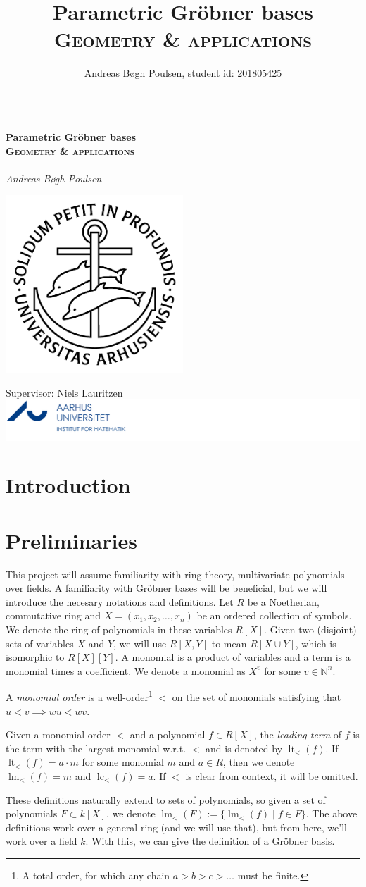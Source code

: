 \documentclass[a4paper, 12pt]{article}
\title{Parametric Gröbner bases\\{\large \textsc{Geometry \& applications}}}
\author{Andreas Bøgh Poulsen, student id: 201805425}
\newcommand{\N}{\mathbb{N}}
\DeclareMathOperator{\LT}{lt}
\DeclareMathOperator{\LM}{lm}
\DeclareMathOperator{\LC}{lc}
\theoremstyle{changedot}
\theoremstyle{changedotbreak}
\theoremstyle{nonumberplain}
\newcommand*{\titleGM}{%
\hspace*{0.2\textwidth} %
\rule{1pt}{\textheight} %
\hspace*{0.05\textwidth} %
\parbox[b]{0.75\textwidth}{ %
{\noindent\Huge\bfseries  Parametric Gröbner bases\\{\large \textsc{Geometry \& applications}}\\}\\[2\baselineskip] %
{\large \textit{Andreas Bøgh Poulsen \hfill \oldstylenums{201805425} }}\\%
{\large } %
\parbox[b][0pt]{0.5\textwidth}{
  \hspace{2cm}\includegraphics[width=0.5\textwidth]{ausegl_sort.png}
  \vspace{-10cm}
}

\vspace{0.5\textheight} %
\vfill
{\noindent Supervisor: Niels Lauritzen \hspace{2.5cm} \includegraphics{AU_logo.png}  }\\[\baselineskip] %
}%
}
\begin{document}
{}
\titleGM
\newpage
\tableofcontents

\newpage
{}

\section*{Introduction}


\section{Preliminaries}
This project will assume familiarity with ring theory, multivariate polynomials over fields. A familiarity with Gröbner bases will be beneficial, but we will introduce the necesary notations and definitions. Let $R$ be a Noetherian, commutative ring and $X = (x_{1}, x_{2}, \dots, x_{n})$ be an ordered collection of symbols. We denote the ring of polynomials in these variables $R[X]$. Given two (disjoint) sets of variables $X$ and $Y$, we will use $R[X, Y]$ to mean $R[X \cup Y]$, which is isomorphic to $R[X][Y]$. A monomial is a product of variables and a term is a monomial times a coefficient. We denote a monomial as $X^{v}$ for some $v \in \N^{n}$.

\begin{definition}
  A \textit{monomial order} is a well-order\footnote{A total order, for which any chain $a > b > c > \dots$ must be finite.} $<$ on the set of monomials satisfying that $u < v \implies wu < wv$.

  Given a monomial order $<$ and a polynomial $f \in R[X]$, the \textit{leading term} of $f$ is the term with the largest monomial w.r.t. $<$ and is denoted by $\LT_{<}(f)$. If $\LT_{<}(f) = a\cdot m$ for some monomial $m$ and $a \in R$, then we denote $\LM_{<}(f) = m$ and $\LC_{<}(f) = a$. If $<$ is clear from context, it will be omitted.
\end{definition}

These definitions naturally extend to sets of polynomials, so given a set of polynomials $F \subset k[X]$, we denote $\LM_{<}(F) := \{\LM_{<}(f) \mid f \in F\}$. The above definitions work over a general ring (and we will use that), but from here, we'll work over a field $k$. With this, we can give the definition of a Gröbner basis.
\end{document}
